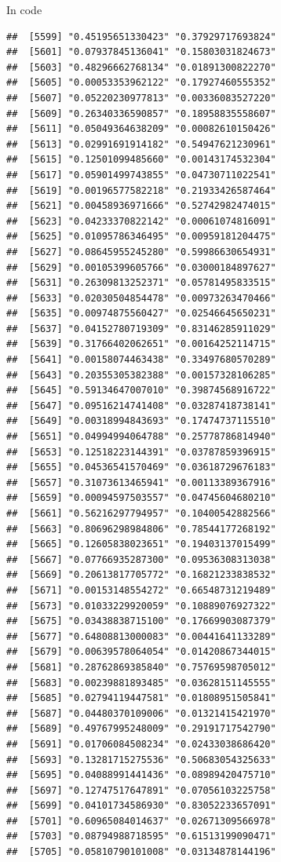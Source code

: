 \documentclass[ignorenonframetext,]{beamer}
\begin{document}
\begin{frame}[fragile]{In code}
\begin{verbatim}
##  [5599] "0.45195651330423" "0.37929717693824"
##  [5601] "0.07937845136041" "0.15803031824673"
##  [5603] "0.48296662768134" "0.01891300822270"
##  [5605] "0.00053353962122" "0.17927460555352"
##  [5607] "0.05220230977813" "0.00336083527220"
##  [5609] "0.26340336590857" "0.18958835558607"
##  [5611] "0.05049364638209" "0.00082610150426"
##  [5613] "0.02991691914182" "0.54947621230961"
##  [5615] "0.12501099485660" "0.00143174532304"
##  [5617] "0.05901499743855" "0.04730711022541"
##  [5619] "0.00196577582218" "0.21933426587464"
##  [5621] "0.00458936971666" "0.52742982474015"
##  [5623] "0.04233370822142" "0.00061074816091"
##  [5625] "0.01095786346495" "0.00959181204475"
##  [5627] "0.08645955245280" "0.59986630654931"
##  [5629] "0.00105399605766" "0.03000184897627"
##  [5631] "0.26309813252371" "0.05781495833515"
##  [5633] "0.02030504854478" "0.00973263470466"
##  [5635] "0.00974875560427" "0.02546645650231"
##  [5637] "0.04152780719309" "0.83146285911029"
##  [5639] "0.31766402062651" "0.00164252114715"
##  [5641] "0.00158074463438" "0.33497680570289"
##  [5643] "0.20355305382388" "0.00157328106285"
##  [5645] "0.59134647007010" "0.39874568916722"
##  [5647] "0.09516214741408" "0.03287418738141"
##  [5649] "0.00318994843693" "0.17474737115510"
##  [5651] "0.04994994064788" "0.25778786814940"
##  [5653] "0.12518223144391" "0.03787859396915"
##  [5655] "0.04536541570469" "0.03618729676183"
##  [5657] "0.31073613465941" "0.00113389367916"
##  [5659] "0.00094597503557" "0.04745604680210"
##  [5661] "0.56216297794957" "0.10400542882566"
##  [5663] "0.80696298984806" "0.78544177268192"
##  [5665] "0.12605838023651" "0.19403137015499"
##  [5667] "0.07766935287300" "0.09536308313038"
##  [5669] "0.20613817705772" "0.16821233838532"
##  [5671] "0.00153148554272" "0.66548731219489"
##  [5673] "0.01033229920059" "0.10889076927322"
##  [5675] "0.03438838715100" "0.17669903087379"
##  [5677] "0.64808813000083" "0.00441641133289"
##  [5679] "0.00639578064054" "0.01420867344015"
##  [5681] "0.28762869385840" "0.75769598705012"
##  [5683] "0.00239881893485" "0.03628151145555"
##  [5685] "0.02794119447581" "0.01808951505841"
##  [5687] "0.04480370109006" "0.01321415421970"
##  [5689] "0.49767995248009" "0.29191717542790"
##  [5691] "0.01706084508234" "0.02433038686420"
##  [5693] "0.13281715275536" "0.50683054325633"
##  [5695] "0.04088991441436" "0.08989420475710"
##  [5697] "0.12747517647891" "0.07056103225758"
##  [5699] "0.04101734586930" "0.83052233657091"
##  [5701] "0.60965084014637" "0.02671309566978"
##  [5703] "0.08794988718595" "0.61513199090471"
##  [5705] "0.05810790101008" "0.03134878144196"

\end{verbatim}
\end{frame}
\end{document}
